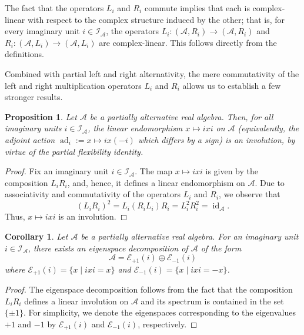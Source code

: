 \documentclass{amsart}
\theoremstyle{definition}
\theoremstyle{plain}
\newtheorem{proposition}{Proposition}
\newtheorem{corollary}{Corollary}
\begin{document}
The fact that the operators $L_i$ and $R_i$ commute implies that each is complex-linear with respect to the complex structure induced by the other; that is, for every imaginary unit $i\in\mathcal{I_A}$, the operators $L_i:(\mathcal{A},R_i)\rightarrow(\mathcal{A},R_i)$ and $R_i:(\mathcal{A},L_i)\rightarrow(\mathcal{A},L_i)$ are complex-linear. This follows directly from the definitions.

Combined with partial left and right alternativity, the mere commutativity of the left and right multiplication operators $L_i$ and $R_i$ allows us to establish a few stronger results.


\begin{proposition}
Let $\mathcal{A}$ be a partially alternative real algebra. Then, for all imaginary units $i\in\mathcal{I_A}$, the linear endomorphism $x\mapsto ixi$ on $\mathcal{A}$ (equivalently, the adjoint action $\operatorname{ad}_i:=x\mapsto ix(-i)$ which differs by a sign) is an involution, by virtue of the partial flexibility identity.
\end{proposition}
\begin{proof}
Fix an imaginary unit $i\in\mathcal{I_A}$. The map $x\mapsto ixi$ is given by the composition $L_iR_i$, and, hence, it defines a linear endomorphism on $\mathcal{A}$. Due to associativity and commutativity of the operators $L_i$ and $R_i$, we observe that
$$(L_iR_i)^2=L_i(R_iL_i)R_i=L_i^2R_i^2=\operatorname{id}_{\mathcal{A}}.$$
Thus, $x\mapsto ixi$ is an involution.
\end{proof}
\begin{corollary}\label{ESD}
Let $\mathcal{A}$ be a partially alternative real algebra. For an imaginary unit $i\in\mathcal{I_A}$, there exists an eigenspace decomposition of $\mathcal{A}$ of the form $$\mathcal{A}=\mathcal{E}_{+1}(i)\oplus\mathcal{E}_{-1}(i)$$
where $\mathcal{E}_{+1}(i)=\{x\mid ixi=x\}$ and $\mathcal{E}_{-1}(i)=\{x\mid ixi=-x\}$.
\end{corollary}
\begin{proof}
The eigenspace decomposition follows from the fact that the composition $L_iR_i$ defines a linear involution on $\mathcal{A}$ and its spectrum is contained in the set $\{\pm1\}$. For simplicity, we denote the eigenspaces corresponding to the eigenvalues $+1$ and $-1$ by $\mathcal{E}_{+1}(i)$ and $\mathcal{E}_{-1}(i)$, respectively.
\end{proof}
\end{document}
